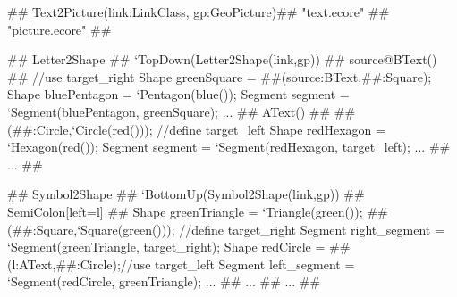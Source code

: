 \begin{tomcode3}[caption=Extrait de code de la transformation \emph{Text2Picture} illustrant les nouvelles constructions {\tom} dédiées aux transformations de modèles et correspondant aux transformations présentées dans la figure~\ref{fig:approachSimpleRulesTrace},label=code:transformationText2Picture]
## Text2Picture(link:LinkClass, gp:GeoPicture)##
                                  "text.ecore" ## "picture.ecore" ##

  ## Letter2Shape ## `TopDown(Letter2Shape(link,gp)) ##
    source@BText() ##
      //use target_right
      Shape greenSquare = ##(source:BText,##:Square);
      Shape bluePentagon = `Pentagon(blue());
      Segment segment = `Segment(bluePentagon, greenSquare);
      ...
    ##
    AText() ##
      ##(##:Circle,`Circle(red())); //define target_left
      Shape redHexagon = `Hexagon(red());
      Segment segment = `Segment(redHexagon, target_left);
      ...
    ##
    ...
  ##

  ## Symbol2Shape ## `BottomUp(Symbol2Shape(link,gp)) ##
    SemiColon[left=l] ##
      Shape greenTriangle = `Triangle(green());
      ##(##:Square,`Square(green())); //define target_right
      Segment right_segment = `Segment(greenTriangle, target_right);
      Shape redCircle = ##(l:AText,##:Circle);//use target_left
      Segment left_segment = `Segment(redCircle, greenTriangle);
      ...
    ##
    ...
  ##
  ...
##
\end{tomcode3}
